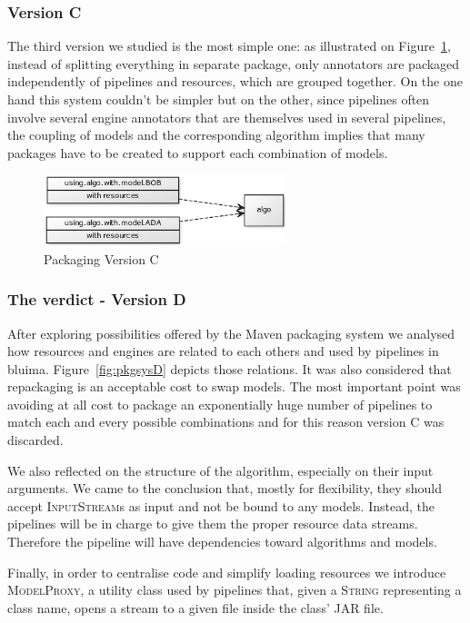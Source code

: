 \documentclass{article}
\newcommand{\ID}[1]{{\textsc{#1}}}
\newcommand{\JAR}{JAR\xspace}
\begin{document}
\subsubsection{Version C}

The third version we studied is the most simple one: as illustrated on Figure~\ref{fig:pkgsysC}, instead of splitting everything in separate package, only annotators are packaged independently of pipelines and resources, which are grouped together. On the one hand this system couldn't be simpler but on the other, since pipelines often involve several engine annotators that are themselves used in several pipelines, the coupling of models and the corresponding algorithm implies that many packages have to be created to support each combination of models.


\begin{figure}
\centering
\includegraphics[width=200pt]{res/packaging_version_C.png}
\caption{Packaging Version C}
\label{fig:pkgsysC}
\end{figure}

\subsubsection{The verdict - Version D}

After exploring possibilities offered by the Maven packaging system we analysed how resources and engines are related to each others and used by pipelines in bluima. Figure~\ref{fig:pkgsysD} depicts those relations. It was also considered that repackaging is an acceptable cost to swap models. The most important point was avoiding at all cost to package an exponentially huge number of pipelines to match each and every possible combinations and for this reason version C was discarded.

We also reflected on the structure of the algorithm, especially on their input arguments. We came to the conclusion that, mostly for flexibility, they should accept \ID{InputStream}s as input and not be bound to any models. Instead, the pipelines will be in charge to give them the proper resource data streams. Therefore the pipeline will have dependencies toward algorithms and models.

Finally, in order to centralise code and simplify loading resources we introduce \ID{ModelProxy}, a
utility class used by pipelines that, given a \ID{String} representing a class name, opens a stream
to a given file inside the class' \JAR file.
\end{document}
